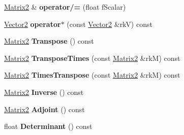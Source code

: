 \begin{DoxyCompactItemize}
\item 
\hyperlink{class_magnum_1_1_matrix2}{Matrix2} \& {\bfseries operator/=} (float f\+Scalar)\hypertarget{class_magnum_1_1_matrix2_a7879bfd5d139dbf21e6eeea6e9a03b99}{}\label{class_magnum_1_1_matrix2_a7879bfd5d139dbf21e6eeea6e9a03b99}

\item 
\hyperlink{class_magnum_1_1_vector2}{Vector2} {\bfseries operator$\ast$} (const \hyperlink{class_magnum_1_1_vector2}{Vector2} \&rkV) const \hypertarget{class_magnum_1_1_matrix2_aed4319791d0cc40112c5d951c17224a3}{}\label{class_magnum_1_1_matrix2_aed4319791d0cc40112c5d951c17224a3}

\item 
\hyperlink{class_magnum_1_1_matrix2}{Matrix2} {\bfseries Transpose} () const \hypertarget{class_magnum_1_1_matrix2_a69b2fc7cd75de3e16f01444b797cbee3}{}\label{class_magnum_1_1_matrix2_a69b2fc7cd75de3e16f01444b797cbee3}

\item 
\hyperlink{class_magnum_1_1_matrix2}{Matrix2} {\bfseries Transpose\+Times} (const \hyperlink{class_magnum_1_1_matrix2}{Matrix2} \&rkM) const \hypertarget{class_magnum_1_1_matrix2_ae3feaa51de8b256d871d30f0c672a2d7}{}\label{class_magnum_1_1_matrix2_ae3feaa51de8b256d871d30f0c672a2d7}

\item 
\hyperlink{class_magnum_1_1_matrix2}{Matrix2} {\bfseries Times\+Transpose} (const \hyperlink{class_magnum_1_1_matrix2}{Matrix2} \&rkM) const \hypertarget{class_magnum_1_1_matrix2_a647d95afb9630194c213f3c2c20ff956}{}\label{class_magnum_1_1_matrix2_a647d95afb9630194c213f3c2c20ff956}

\item 
\hyperlink{class_magnum_1_1_matrix2}{Matrix2} {\bfseries Inverse} () const \hypertarget{class_magnum_1_1_matrix2_ad79760e74adf0025baa4cfdb8e296223}{}\label{class_magnum_1_1_matrix2_ad79760e74adf0025baa4cfdb8e296223}

\item 
\hyperlink{class_magnum_1_1_matrix2}{Matrix2} {\bfseries Adjoint} () const \hypertarget{class_magnum_1_1_matrix2_a96f366b831f0377fcfb5523cbd50c37b}{}\label{class_magnum_1_1_matrix2_a96f366b831f0377fcfb5523cbd50c37b}

\item 
float {\bfseries Determinant} () const \hypertarget{class_magnum_1_1_matrix2_ad9f739c9248b6d2d426f259faedce391}{}\label{class_magnum_1_1_matrix2_ad9f739c9248b6d2d426f259faedce391}


\end{DoxyCompactItemize}
